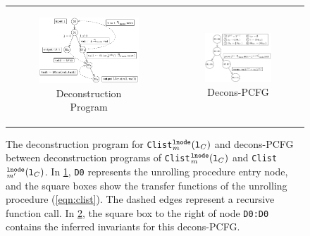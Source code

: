 \begin{figure}[t]
\begin{tabular}{cc}
\begin{subfigure}[b]{0.48\textwidth}
\includegraphics[scale=0.9]{chapters/figures/figClistCfg.pdf}
\caption{\label{fig:reconsProg}Deconstruction Program}
\end{subfigure}%
&
\begin{subfigure}[b]{0.52\textwidth}
\includegraphics[scale=0.9]{chapters/figures/figClistProductCfg.pdf}
\caption{\label{fig:reconsPCFG}Decons-PCFG}
\end{subfigure}%
\\
\end{tabular}
\caption{\label{fig:recons}The deconstruction program for {\tt Clist}$_m^{\tt lnode}({\tt l}_C)$ and decons-PCFG between deconstruction programs of {\tt Clist}$_m^{\tt lnode}({\tt l}_C)$ and {\tt Clist}$_{m'}^{\tt lnode}({\tt l}_C)$.
In \cref{fig:reconsProg}, {\tt D0} represents the unrolling procedure entry node, and the square boxes show the transfer functions of the unrolling procedure (\cref{eqn:clist}).
The dashed edges represent a recursive function call.
In \cref{fig:reconsPCFG}, the square box to the right of node {\tt D0:D0} contains the inferred invariants for this decons-PCFG.}
\end{figure}

